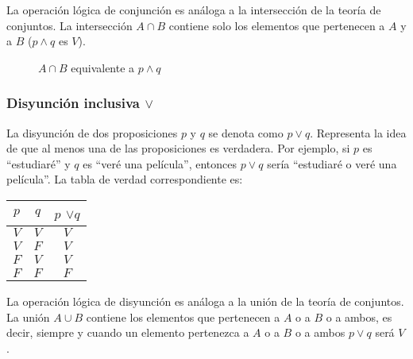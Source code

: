 La operación lógica de conjunción es análoga a la intersección de la teoría de conjuntos. La intersección $A \cap B$ contiene solo los elementos que pertenecen a $A$ y a $B$ ($p \land q$ es $V$).

\begin{figure}[h]
	\centering
{}
\caption*{$A \cap B$ equivalente a $p \land q$}
\end{figure}

\subsubsection{Disyunción inclusiva $\lor$}
La disyunción de dos proposiciones $p$ y $q$ se denota como $p \lor q$. Representa la idea de que al menos una de las proposiciones es verdadera. Por ejemplo, si $p$ es ``estudiaré'' y $q$ es ``veré una película'', entonces $p \lor q$ sería ``estudiaré o veré una película''. La tabla de verdad correspondiente es:

\begin{table}[h]
	\centering
	\begin{tabular}{|c|c|c|} \hline
		 $p$ & $q$ & $p$ $\lor q$ \\ \hline
		 $V$ & $V$ & $V$ \\
		 $V$ & $F$ & $V$ \\
		 $F$ & $V$ & $V$ \\
		 $F$ & $F$ & $F$ \\ \hline
	\end{tabular}
\end{table}

La operación lógica de disyunción es análoga a la unión de la teoría de conjuntos. La unión $A \cup B$ contiene los elementos que pertenecen a $A$ o a $B$ o a ambos, es decir, siempre y cuando un elemento pertenezca a $A$ o a $B$ o a ambos $p \lor q$ será $V$.

